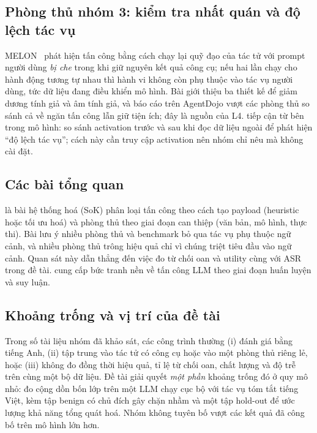 \subsection{Phòng thủ nhóm 3: kiểm tra nhất quán và độ lệch tác vụ}
MELON~\citep{zhu2025melon} phát hiện tấn công bằng cách chạy lại quỹ đạo của tác tử với prompt người dùng \emph{bị che} trong khi giữ nguyên kết quả công cụ; nếu hai lần chạy cho hành động tương tự nhau thì hành vi không còn phụ thuộc vào tác vụ người dùng, tức dữ liệu đang điều khiển mô hình. Bài giới thiệu ba thiết kế để giảm dương tính giả và âm tính giả, và báo cáo trên AgentDojo vượt các phòng thủ so sánh cả về ngăn tấn công lẫn giữ tiện ích; đây là nguồn của L4. \citet{abdelnabi2025drift} tiếp cận từ bên trong mô hình: so sánh activation trước và sau khi đọc dữ liệu ngoài để phát hiện ``độ lệch tác vụ''; cách này cần truy cập activation nên nhóm chỉ nêu mà không cài đặt.

\subsection{Các bài tổng quan}
\citet{wang2026landscape} là bài hệ thống hoá (SoK) phân loại tấn công theo cách tạo payload (heuristic hoặc tối ưu hoá) và phòng thủ theo giai đoạn can thiệp (văn bản, mô hình, thực thi). Bài lưu ý nhiều phòng thủ và benchmark bỏ qua tác vụ phụ thuộc ngữ cảnh, và nhiều phòng thủ trông hiệu quả chỉ vì chúng triệt tiêu đầu vào ngữ cảnh. Quan sát này dẫn thẳng đến việc đo từ chối oan và utility cùng với ASR trong đề tài. \citet{xu2025survey} cung cấp bức tranh nền về tấn công LLM theo giai đoạn huấn luyện và suy luận.

\subsection{Khoảng trống và vị trí của đề tài}
Trong số tài liệu nhóm đã khảo sát, các công trình thường (i) đánh giá bằng tiếng Anh, (ii) tập trung vào tác tử có công cụ hoặc vào một phòng thủ riêng lẻ, hoặc (iii) không đo đồng thời hiệu quả, tỉ lệ từ chối oan, chất lượng và độ trễ trên cùng một bộ dữ liệu. Đề tài giải quyết \emph{một phần} khoảng trống đó ở quy mô nhỏ: đo cộng dồn bốn lớp trên một LLM chạy cục bộ với tác vụ tóm tắt tiếng Việt, kèm tập benign có chủ đích gây chặn nhầm và một tập hold-out để ước lượng khả năng tổng quát hoá. Nhóm không tuyên bố vượt các kết quả đã công bố trên mô hình lớn hơn.
